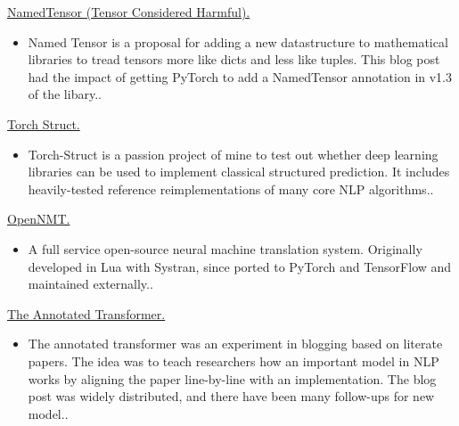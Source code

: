 \documentclass[10pt]{article}
\begin{document}
\ind \href{ paper.link } { NamedTensor (Tensor Considered Harmful). }
\begin{itemize}
\item Named Tensor is a proposal for adding a new datastructure to mathematical libraries to tread tensors more like dicts and less like tuples. This blog post had the impact of getting PyTorch to add a NamedTensor annotation in v1.3 of the libary..
\end{itemize}
\medskip


\ind \href{ paper.link } { Torch Struct. }
\begin{itemize}
\item Torch-Struct is a passion project of mine to test out whether deep learning libraries can be used to implement classical structured prediction. It includes heavily-tested reference reimplementations of many core NLP algorithms..
\end{itemize}
\medskip


\ind \href{ paper.link } { OpenNMT. }
\begin{itemize}
\item A full service open-source neural machine translation system. Originally developed in Lua with Systran, since ported to PyTorch and TensorFlow and maintained externally..
\end{itemize}
\medskip


\ind \href{ paper.link } { The Annotated Transformer. }
\begin{itemize}
\item The annotated transformer was an experiment in blogging based on literate papers. The idea was to teach researchers how an important model in NLP works by aligning the paper line-by-line with an implementation. The blog post was widely distributed, and there have been many follow-ups for new model..
\end{itemize}
\medskip








\end{document}
